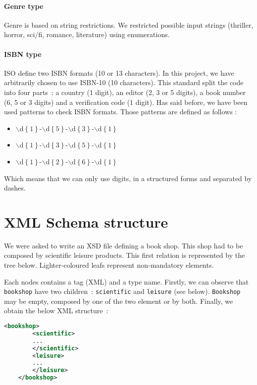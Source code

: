 \documentclass{article}
\begin{document}
\paragraph{Genre type}
Genre is based on string restrictions. We restricted possible input strings (thriller, horror, sci/fi, romance, literature) using enumerations.  
\paragraph{ISBN type}
    \label{sec:isbn}
    ISO define two ISBN formats (10 or 13 characters). In this project, we have arbitrarily chosen to use ISBN-10 (10 characters). This standard split the code into four parts~: a country (1 digit), an editor (2, 3 or 5 digits), a book number (6, 5 or 3 digits) and a verification code (1 digit). Has said before, we have been used patterns to check ISBN formats. Those patterns are defined as follows : 
    \begin{itemize}
    \item $\backslash$d$\left\{ 1\right\}$-$\backslash$d$\left\{ 5 \right\}$-$\backslash$d$\left\{ 3 \right\}$-$\backslash$d$\left\{ 1 \right\}$
    \item $\backslash$d$\left\{ 1 \right\}$-$\backslash$d$\left\{ 3 \right\}$-$\backslash$d$\left\{ 5 \right\}$-$\backslash$d$\left\{ 1 \right\}$
    \item $\backslash$d$\left\{ 1 \right\}$-$\backslash$d$\left\{ 2 \right\}$-$\backslash$d$\left\{ 6 \right\}$-$\backslash$d$\left\{ 1 \right\}$
    \end{itemize}
    Which means that we can only use digits, in a structured forms and separated by dashes.
  
  
\section{XML Schema structure}
We were asked to write an XSD file defining a book shop. This shop had to be composed by scientific leisure products. This first relation is represented by the tree below. Lighter-coloured leafs represent non-mandatory elements.
  \begin{center}
  \end{center}
  Each nodes contains a tag (XML) and a type name. Firstly, we can observe that \verb|bookshop| have two children~: \verb|scientific| and \verb|leisure| (see below). \verb|Bookshop| may be empty, composed by one of the two element or by both. Finally, we obtain the below XML structure~:
  \begin{lstlisting}[language=XML]
    <bookshop>
        <scientific>
	    ...
        </scientific>
        <leisure>
	    ...
        </leisure>
    </bookshop>
  \end{lstlisting}
\end{document}
